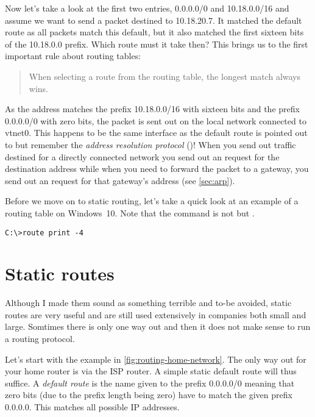 Now let's take a look at the first two entries, 0.0.0.0/0 and 10.18.0.0/16 and assume we want to send a packet destined to 10.18.20.7.
It matched the default route as all packets match this default, but it also matched the first sixteen bits of the 10.18.0.0 prefix.
Which route must it take then?
This brings us to the first important rule about routing tables:

\begin{quote}
   When selecting a route from the routing table, the longest match always wins.
\end{quote}

As the  address matches the prefix 10.18.0.0/16 with sixteen bits and the prefix 0.0.0.0/0 with zero bits, the packet is sent out on the local network connected to vtnet0.
This happens to be the same interface as the default route is pointed out to but remember the \emph{address resolution protocol} ()!
When you send out traffic destined for a directly connected network you send out an  request for the destination  address while when you need to forward the packet to a gateway, you send out an  request for that gateway's  address (see \vref{sec:arp}).

Before we move on to static routing, let's take a quick look at an example of a routing table on Windows~10.
Note that the command is not  but .

\begin{verbatim}
C:\>route print -4
\end{verbatim}




\section{Static routes}

Although I made them sound as something terrible and to-be avoided, static routes are very useful and are still used extensively in companies both small and large.
Somtimes there is only one way out and then it does not make sense to run a routing protocol.

Let's start with the example in \vref{fig:routing-home-network}.
The only way out for your home router is via the ISP router.
A simple static default route will thus suffice.
A \emph{default route} is the name given to the prefix 0.0.0.0/0 meaning that zero bits (due to the prefix length being zero) have to match the given prefix 0.0.0.0.
This matches all possible IP addresses.


